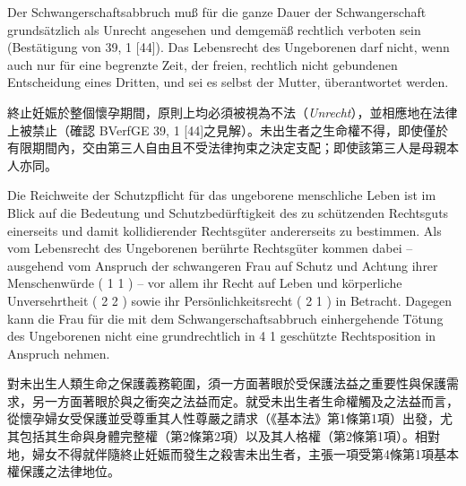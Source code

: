\documentclass[12pt]{article}
\begin{document}
\syncleft
\begin{sourcepara}[title={原文要旨 4}]
Der Schwangerschaftsabbruch muß für die ganze Dauer der Schwangerschaft grundsätzlich als Unrecht angesehen und demgemäß rechtlich verboten sein (Bestätigung von \abbrBVerfGE{} 39, 1 [44]). Das Lebensrecht des Ungeborenen darf nicht, wenn auch nur für eine begrenzte Zeit, der freien, rechtlich nicht gebundenen Entscheidung eines Dritten, und sei es selbst der Mutter, überantwortet werden.
\end{sourcepara}
\begin{transpara}
終止妊娠於整個懷孕期間，原則上均必須被視為不法（\textit{Unrecht}），並相應地在法律上被禁止（確認 BVerfGE 39, 1 [44]之見解）。未出生者之生命權不得，即使僅於有限期間內，交由第三人自由且不受法律拘束之決定支配；即使該第三人是母親本人亦同。
\end{transpara}

\syncleft
\begin{sourcepara}[title={原文要旨 5}]
Die Reichweite der Schutzpflicht für das ungeborene menschliche Leben ist im Blick auf die Bedeutung und Schutzbedürftigkeit des zu schützenden Rechtsguts einerseits und damit kollidierender Rechtsgüter andererseits zu bestimmen. Als vom Lebensrecht des Ungeborenen berührte Rechtsgüter kommen dabei -- ausgehend vom Anspruch der schwangeren Frau auf Schutz und Achtung ihrer Menschenwürde (\abbrArt{} 1 \abbrAbs{} 1 \abbrGG{}\ggfnArtOneOneDE{}) -- vor allem ihr Recht auf Leben und körperliche Unversehrtheit (\abbrArt{} 2 \abbrAbs{} 2 \abbrGG{}\ggfnArtTwoTwoDE{}) sowie ihr Persönlichkeitsrecht (\abbrArt{} 2 \abbrAbs{} 1 \abbrGG{}\ggfnArtTwoOneDE{}) in Betracht. Dagegen kann die Frau für die mit dem Schwangerschaftsabbruch einhergehende Tötung des Ungeborenen nicht eine grundrechtlich in \abbrArt{} 4 \abbrAbs{} 1 \abbrGG{}\ggfnArtFourOneDE{} geschützte Rechtsposition in Anspruch nehmen.
\end{sourcepara}
\begin{transpara}
對未出生人類生命之保護義務範圍，須一方面著眼於受保護法益之重要性與保護需求，另一方面著眼於與之衝突之法益而定。就受未出生者生命權觸及之法益而言，從懷孕婦女受保護並受尊重其人性尊嚴之請求（《基本法》第1條第1項\ggfnArtOneOneZH{}）出發，尤其包括其生命與身體完整權（第2條第2項\ggfnArtTwoTwoZH{}）以及其人格權（第2條第1項\ggfnArtTwoOneZH{}）。相對地，婦女不得就伴隨終止妊娠而發生之殺害未出生者，主張一項受第4條第1項\ggfnArtFourOneZH{}基本權保護之法律地位。
\end{transpara}
\end{document}
